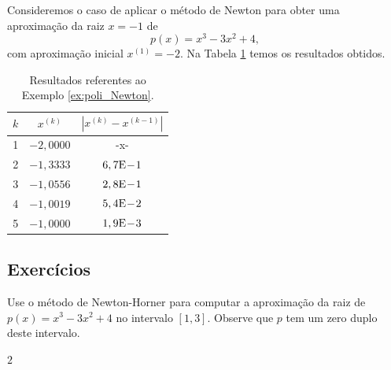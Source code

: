 \begin{ex}\label{ex:poli_Newton}
  Consideremos o caso de aplicar o método de Newton para obter uma aproximação da raiz $x=-1$ de
  \begin{equation}
    p(x) = x^3 - 3x^2 + 4,
  \end{equation}
  com aproximação inicial $x^{(1)} = -2$. Na Tabela \ref{tab:ex_poli_Newton} temos os resultados obtidos.

\begin{table}[h!]
  \centering
  \caption{Resultados referentes ao Exemplo \ref{ex:poli_Newton}.}
  \label{tab:ex_poli_Newton}
  \begin{tabular}{r|cc}
    $k$ & $x^{(k)}$ & $|x^{(k)}-x^{(k-1)}|$ \\\hline
    1 & $-2,0000$ & -x- \\
    2 & $-1,3333$ & $6,7\mathrm{E}\!-\!1$ \\
    3 & $-1,0556$ & $2,8\mathrm{E}\!-\!1$ \\
    4 & $-1,0019$ & $5,4\mathrm{E}\!-\!2$ \\
    5 & $-1,0000$ & $1,9\mathrm{E}\!-\!3$ \\\hline
  \end{tabular}
\end{table}


% 
\end{ex}

\subsection*{Exercícios}

\begin{exer}
  Use o método de Newton-Horner para computar a aproximação da raiz de $p(x) = x^3 - 3x^2 + 4$ no intervalo $[1,3]$. Observe que $p$ tem um zero duplo deste intervalo.
\end{exer}
\begin{resp}
  $2$
\end{resp}